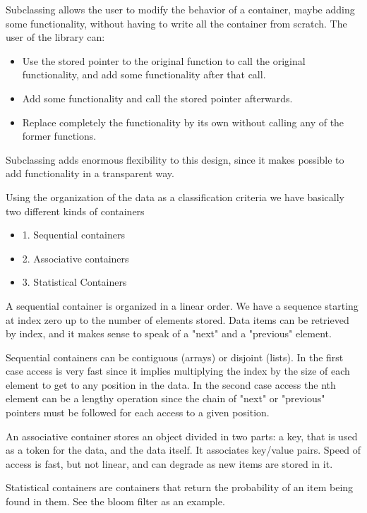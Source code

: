 \documentclass[12pt,a4paper]{memoir} %
\begin{document}
Subclassing allows the user to modify the behavior of a container, maybe adding some functionality, without having to write all the container from
scratch. The user of the library can:
\begin{itemize}
\item Use the stored pointer to the original function to call the original functionality, and add some functionality after that call.
\item Add some functionality and call the stored pointer afterwards.
\item Replace completely the functionality by its own without calling any of the former functions.
\end{itemize}
Subclassing adds enormous flexibility to this design, since it makes possible to add functionality in a transparent way.

Using the organization of the data as a classification criteria we have basically two different kinds of containers
\begin{itemize}
\item
1. Sequential containers
\item
2. Associative containers
\item
3. Statistical Containers
\end{itemize}

A sequential container is organized in a linear order. We have a sequence starting at index zero up to the number of elements stored. Data items can be 
retrieved by index, and it makes sense to speak of a "next" and a "previous" element.

Sequential containers can be contiguous (arrays) or disjoint (lists). In the first case access is very fast since it implies multiplying the index by 
the size of each element to get to any position in the data. In the second case access the nth element can be a lengthy operation since the chain of 
"next" or "previous" pointers must be followed for each access to a given position.

An associative container stores an object divided in two parts: a key, that is used as a token for the data, and the data itself. It associates 
key/value pairs. Speed of access is fast, but not linear, and can degrade as new items are stored in it.

Statistical containers are containers that return the probability of an item being found in them. See the bloom filter as an example.
\end{document}
